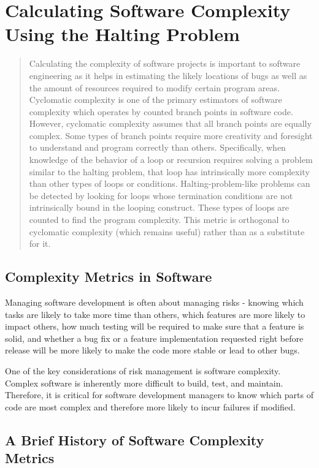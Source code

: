 \chapter{Calculating Software Complexity Using the Halting Problem}
\author{Jonathan Bartlett}

\begin{abstract}
Calculating the complexity of software projects is important to software engineering as it helps in estimating the likely locations of bugs as well as the amount of resources required to modify certain program areas.  Cyclomatic complexity is one of the primary estimators of software complexity which operates by counted branch points in software code.  However, cyclomatic complexity assumes that all branch points are equally complex.  Some types of branch points require more creativity and foresight to understand and program correctly than others.  Specifically, when knowledge of the behavior of a loop or recursion requires solving a problem similar to the halting problem, that loop has intrinsically more complexity than other types of loops or conditions.  Halting-problem-like problems can be detected by looking for loops whose termination conditions are not intrinsically bound in the looping construct.  These types of loops are counted to find the program complexity.  This metric is orthogonal to cyclomatic complexity (which remains useful) rather than as a substitute for it.
\end{abstract}

\section{Complexity Metrics in Software}

Managing software development is often about managing risks - knowing which tasks are likely to take more time than others, which features are more likely to impact others, how much testing will be required to make sure that a feature is solid, and whether a bug fix or a feature implementation requested right before release will be more likely to make the code more stable or lead to other bugs.

One of the key considerations of risk management is software complexity.  Complex software is inherently more difficult to build, test, and maintain.  Therefore, it is critical for software development managers to know which parts of code are most complex and therefore more likely to incur failures if modified.

\section{A Brief History of Software Complexity Metrics}

